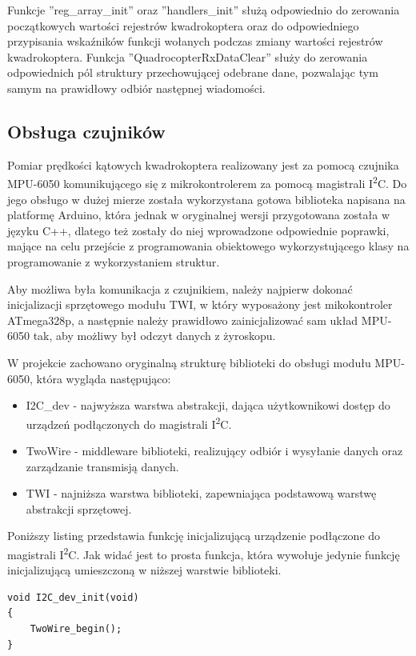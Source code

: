 Funkcje ''reg\_array\_init'' oraz ''handlers\_init'' służą odpowiednio do zerowania początkowych wartości rejestrów kwadrokoptera oraz do odpowiedniego przypisania wskaźników funkcji wołanych podczas zmiany wartości rejestrów kwadrokoptera. Funkcja ''QuadrocopterRxDataClear'' służy do zerowania odpowiednich pól struktury przechowującej odebrane dane, pozwalając tym samym na prawidłowy odbiór następnej wiadomości.

\subsection{Obsługa czujników}

Pomiar prędkości kątowych kwadrokoptera realizowany jest za pomocą czujnika MPU-6050 komunikującego się z mikrokontrolerem za pomocą magistrali I\textsuperscript{2}C. Do jego obsługo w dużej mierze została wykorzystana gotowa biblioteka napisana na platformę Arduino, która jednak w oryginalnej wersji przygotowana została w języku C++, dlatego też zostały do niej wprowadzone odpowiednie poprawki, mające na celu przejście z programowania obiektowego wykorzystującego klasy na programowanie z wykorzystaniem struktur. 

Aby możliwa była komunikacja z czujnikiem, należy najpierw dokonać inicjalizacji sprzętowego modułu TWI, w który wyposażony jest mikokontroler ATmega328p, a następnie należy prawidłowo zainicjalizować sam układ MPU-6050 tak, aby możliwy był odczyt danych z żyroskopu.

W projekcie zachowano oryginalną strukturę biblioteki do obsługi modułu MPU-6050, która wygląda następująco:
\begin{itemize}
	\item I2C\_dev - najwyższa warstwa abstrakcji, dająca użytkownikowi dostęp do urządzeń podłączonych do magistrali I\textsuperscript{2}C.
	\item TwoWire - middleware biblioteki, realizujący odbiór i wysyłanie danych oraz zarządzanie transmisją danych.
	\item TWI - najniższa warstwa biblioteki, zapewniająca podstawową warstwę abstrakcji sprzętowej.
\end{itemize}

Poniższy listing przedstawia funkcję inicjalizującą urządzenie podłączone do magistrali I\textsuperscript{2}C. Jak widać jest to prosta funkcja, która wywołuje jedynie funkcję inicjalizującą umieszczoną w niższej warstwie biblioteki.

\begin{lstlisting}
void I2C_dev_init(void)
{
	TwoWire_begin();
}
\end{lstlisting}

